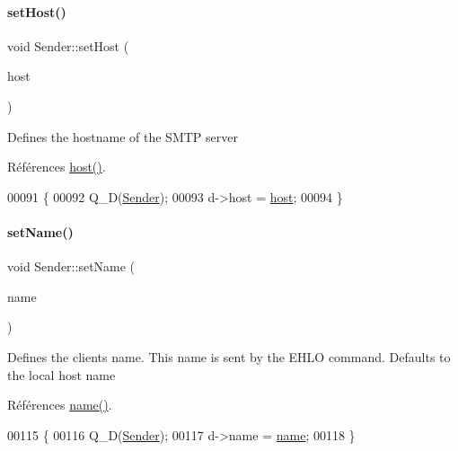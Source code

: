 \paragraph{\texorpdfstring{set\+Host()}{setHost()}}
{\footnotesize\ttfamily void Sender\+::set\+Host (\begin{DoxyParamCaption}\item[{const Q\+String \&}]{host }\end{DoxyParamCaption})}

Defines the hostname of the S\+M\+TP server 

Références \hyperlink{class_simple_mail_1_1_sender_a688b0cf38532aa73fa943fa4a8d9f797}{host()}.


\begin{DoxyCode}
00091 \{
00092     Q\_D(\hyperlink{class_simple_mail_1_1_sender}{Sender});
00093     d->host = \hyperlink{class_simple_mail_1_1_sender_a688b0cf38532aa73fa943fa4a8d9f797}{host};
00094 \}
\end{DoxyCode}
\mbox{\label{class_simple_mail_1_1_sender_a02d30b604180e3502d6c773751a6c1e6}} 
\paragraph{\texorpdfstring{set\+Name()}{setName()}}
{\footnotesize\ttfamily void Sender\+::set\+Name (\begin{DoxyParamCaption}\item[{const Q\+String \&}]{name }\end{DoxyParamCaption})}

Defines the client\textquotesingle{}s name. This name is sent by the E\+H\+LO command. Defaults to the local host name 

Références \hyperlink{class_simple_mail_1_1_sender_ab329650eae52416579e4ed1bb90d49e4}{name()}.


\begin{DoxyCode}
00115 \{
00116     Q\_D(\hyperlink{class_simple_mail_1_1_sender}{Sender});
00117     d->name = \hyperlink{class_simple_mail_1_1_sender_ab329650eae52416579e4ed1bb90d49e4}{name};
00118 \}
\end{DoxyCode}
\mbox{\label{class_simple_mail_1_1_sender_ae71f3d10ecc970e5c56ac01b1f05ff9b}} 
